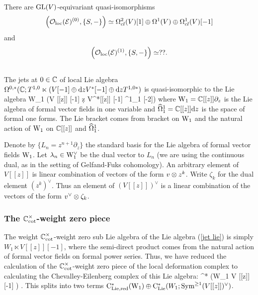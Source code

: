 \begin{prop} There are ${\rm GL}(V)$-equivariant quasi-isomorphisms
\[
\left(\mathcal{O}_{\rm loc}(\mathcal E)^{(0)}, \{S,-\}\right) \simeq \Omega^2_{cl}(V)[1] \oplus \Omega^1(V) \oplus \Omega^1_{cl}(V)[-1] 
\]
and
\[
\left(\mathcal{O}_{\rm loc}(\mathcal E)^{(1)} , \{S,-\}\right) \simeq ?? .
\]
\end{prop}

\subsection{}

The jets at $0 \in \mathbb C$ of local Lie algebra $\Omega^{0,*}(\mathbb C ; T^{1,0} \ltimes (V[-1] \oplus {\rm d} z V^*[-1] \oplus {\rm d} z T^{1,0 *})$ is quasi-isomorphic to the Lie algebra
\be\label{jet lie}
{\rm W}_1 \ltimes (V [[z]] [-1] \oplus \d z V^*[[z]] [-1] \oplus \hOmega^1_1 [-2])
\ee
where ${\rm W}_1 = \mathbb C [[z]] \partial_z$ is the Lie algebra of formal vector fields in one variable and $\widehat{\Omega}^1_1 = \mathbb C [[z]] {\rm d} z$ is the space of formal one forms. 
The Lie bracket comes from bracket on ${\rm W}_1$ and the natural action of ${\rm W}_1$ on $\mathbb C [[z]]$ and $\widehat{\Omega}^1_1$. 

Denote by $\{L_n = z^{n+1} \partial_z\}$ the standard basis for the Lie algebra of formal vector fields ${\rm W}_1$. 
Let $\lambda_n \in {\rm W}_1^\vee$ be the dual vector to $L_n$ (we are using the continuous dual, as in the setting of Gelfand-Fuks cohomology). 
An arbitrary element of $V [[z]]$ is linear combination of vectors of the form $v \otimes z^k$. 
Write $\zeta_k$ for the dual element $(z^k)^\vee$. 
Thus an element of $(V [[z]])^\vee$ is a linear combination of the vectors of the form $v^\vee \otimes \zeta_k$. 

\subsubsection{The $\mathbb C^\times_{\rm cot}$-weight zero piece}

The weight $\mathbb C^\times_{\rm cot}$-weight zero sub Lie algebra of the Lie algebra (\ref{jet lie}) is simply $W_1 \ltimes V [[z]] [-1]$, where the semi-direct product comes from the natural action of formal vector fields on formal power series.
Thus, we have reduced the calculation of the $\mathbb C^\times_{\rm cot}$-weight zero piece of the local deformation complex to calculating the Chevalley-Eilenberg complex of this Lie algebra:
\ben
\cred^* \left({\rm W}_1 \ltimes V [[z]] [-1] \right) .
\een
This splits into two terms ${\rm C}_{\rm Lie,red}^* ({\rm W}_1) \oplus {\rm C}_{{\rm Lie}}^*(W_1 ;  {\rm Sym}^{\geq 1} (V [[z]])^\vee)$. 

